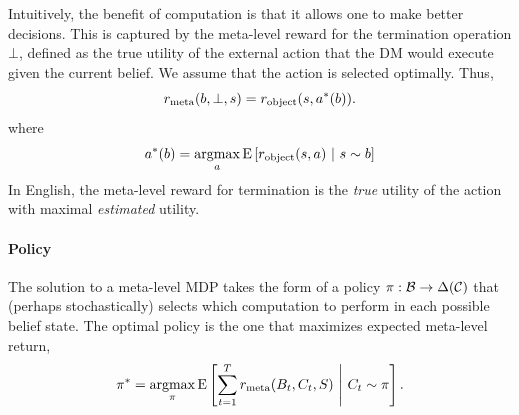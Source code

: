 Intuitively, the benefit of computation is that it allows one to make better decisions. This is captured by the meta-level reward for the termination operation $\bot$, defined as the true utility of the external action that the DM would execute given the current belief. We assume that the action is selected optimally. Thus,
%
\begin{equation}\label{eq:term-reward}
r_{\text{meta}}(b, \bot, s) = r_{\text{object}}(s, a^*(b)).
\end{equation}
%
where
%
\begin{equation}\label{eq:object-action}
a^*(b) = \operatorname*{argmax}_a \operatorname*{E} \left[ r_{\text{object}}(s, a) \ \middle\vert\ s \sim b \right]
\end{equation}
%
In English, the meta-level reward for termination is the \emph{true} utility of the action\footnotemark{} with maximal \emph{estimated} utility.


\paragraph{Policy}

The solution to a meta-level MDP takes the form of a policy $\pi: \mathcal{B} \rightarrow \Delta(\mathcal{C})$ that (perhaps stochastically) selects which computation to perform in each possible belief state. The optimal policy is the one that maximizes expected meta-level return,
%
\begin{equation}
  \pi^* = \operatorname*{argmax}_\pi \operatorname*{E} \left[ 
    \sum_{t=1}^T r_{\text{meta}}(B_t, C_t, S)
   \ \middle\vert\ 
    C_t \sim \pi
   \right].
\end{equation}
